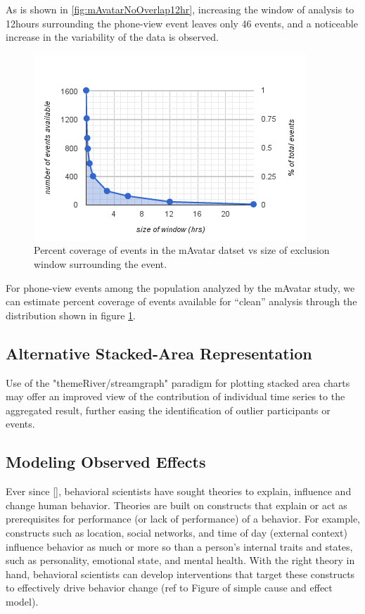 As is shown in \ref{fig:mAvatarNoOverlap12hr}, increasing the window of analysis to 12hours surrounding the phone-view event leaves only 46 events, and a noticeable increase in the variability of the data is observed.

\begin{figure}
\centering
\includegraphics[width=0.9\columnwidth]{./img/events_v_windowSize.png}
\caption{Percent coverage of events in the mAvatar datset vs size of exclusion window surrounding the event.}
\label{fig:eventsVwindow}
\end{figure}

For phone-view events among the population analyzed by the mAvatar study, we can estimate percent coverage of events available for ``clean'' analysis through the distribution shown in figure \ref{fig:eventsVwindow}.

\subsection{Alternative Stacked-Area Representation}
Use of the "themeRiver/streamgraph" \cite{havre200, byron2008} paradigm for plotting stacked area charts may offer an improved view of the contribution of individual time series to the aggregated result, further easing the identification of outlier participants or events.

\subsection{Modeling Observed Effects}
Ever since [], behavioral scientists have sought theories to explain, influence and change human behavior.
Theories are  built on constructs that explain or act as prerequisites for performance (or lack of performance) of a behavior.
For example, constructs such as location, social networks, and time of day (external context) influence behavior as much or more so than a person's internal traits and states, such as personality, emotional state, and mental health.
With the right theory in hand, behavioral scientists can develop interventions that target these constructs to effectively drive behavior change (ref to Figure of simple cause and effect model).

